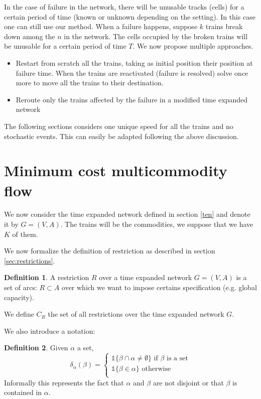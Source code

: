 \documentclass[14pt,a4paper]{article}
\theoremstyle{definition}
\newtheorem{madef}{Definition}[section]
\numberwithin{equation}{subsection}
\begin{document}
In the case of failure in the network, there will be  unusable tracks (cells) for a certain period of time (known or unknown depending on the setting). In this case one can still use our method.
When a failure happens, suppose $k$ trains break down among the $n$ in the network. The cells occupied by the broken trains will be unusable for a certain period of time $T$. We now propose multiple approaches.
\begin{itemize}



		\item Restart from scratch all the trains, taking as initial position their position at failure time. When the trains are reactivated (failure is resolved) solve once more to move all the trains to their destination.
		\item Reroute only the trains affected by the failure in a modified time expanded network

\end{itemize}




The following sections considers one unique speed for all the trains and no stochastic events. This can easily be adapted  following the above discussion.
\newpage
\section{Minimum cost multicommodity flow}

We now consider the time expanded network defined in section \ref*{ten} and denote it by $G = (V,A)$. The trains will be the commodities, we suppose that we have $K$ of them.

We now formalize the definition of restriction as described in section \ref*{sec:restrictions}.

\begin{madef}
	A restriction $R$ over a time expanded network $G = (V,A)$ is a set of arcs: $R \subset A$ over which we want to impose certains specification (e.g. global capacity).
	
	We define $C_R$ the set of all restrictions over the time expanded network $G$.
\end{madef}



We also introduce a notation:
\begin{madef}
	Given $\alpha$ a set,
	\[
	\delta_\alpha(\beta)=\left\{
	\begin{array}{ll}
	 \mathds{1}{\{\beta \cap \alpha \neq \emptyset\}} \text{ if } \beta \text{ is a set}\\
	\mathds{1}{\{\beta \in \alpha\}} \text{ otherwise}\\
	\end{array}
	\right.
	\]
	Informally this represents the fact that $\alpha$ and $\beta$ are not disjoint or that $\beta$ is contained in $\alpha$.

\end{madef}
\end{document}
